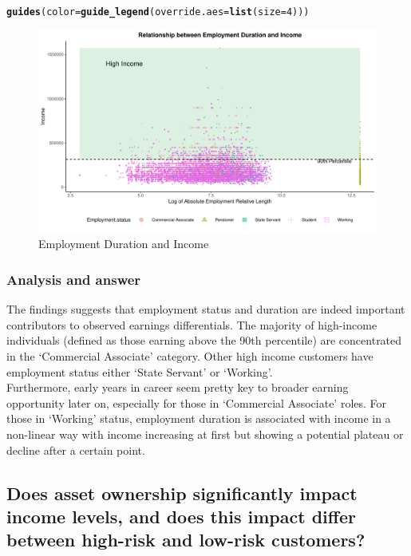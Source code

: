\documentclass{article}\usepackage[]{graphicx}\usepackage[]{xcolor}
\makeatletter
\def\maxwidth{ %
  \ifdim\Gin@nat@width>\linewidth
    \linewidth
  \else
    \Gin@nat@width
  \fi
}
\newcommand{\hlnum}[1]{\textcolor[rgb]{0.686,0.059,0.569}{#1}}%
\newcommand{\hldef}[1]{\textcolor[rgb]{0.345,0.345,0.345}{#1}}%
\newcommand{\hlkwc}[1]{\textcolor[rgb]{0.333,0.667,0.333}{#1}}%
\newcommand{\hlkwd}[1]{\textcolor[rgb]{0.737,0.353,0.396}{\textbf{#1}}}%
\newenvironment{kframe}{%
 \def\at@end@of@kframe{}%
 \ifinner\ifhmode%
  \def\at@end@of@kframe{\end{minipage}}%
  \begin{minipage}{\columnwidth}%
 \fi\fi%
 \def\FrameCommand##1{\hskip\@totalleftmargin \hskip-\fboxsep
 \colorbox{shadecolor}{##1}\hskip-\fboxsep
     \hskip-\linewidth \hskip-\@totalleftmargin \hskip\columnwidth}%
 \MakeFramed {\advance\hsize-\width
   \@totalleftmargin\z@ \linewidth\hsize
   \@setminipage}}%
 {\par\unskip\endMakeFramed%
 \at@end@of@kframe}
\newenvironment{knitrout}{}{} %
\makeatother
\begin{document}
\begin{knitrout}
\begin{kframe}
\begin{alltt}
  \hlkwd{guides}\hldef{(}\hlkwc{color} \hldef{=} \hlkwd{guide_legend}\hldef{(}\hlkwc{override.aes} \hldef{=} \hlkwd{list}\hldef{(}\hlkwc{size} \hldef{=} \hlnum{4}\hldef{)))}
\end{alltt}
\end{kframe}\begin{figure}[H]
\includegraphics[width=\maxwidth]{figure/unnamed-chunk-46-1} \caption[Employment Duration and Income]{Employment Duration and Income}\label{fig:unnamed-chunk-46}
\end{figure}

\end{knitrout}

\subsubsection{Analysis and answer}

The findings suggests that employment status and duration are indeed important contributors to observed earnings differentials.  The majority of high-income individuals (defined as those earning above the 90th percentile) are concentrated in the `Commercial Associate' category. Other high income customers have employment status either `State Servant' or `Working'. \\

Furthermore, early years in career seem pretty key to broader earning opportunity later on, especially for those in `Commercial Associate' roles.  For those in `Working' status, employment duration is associated with income in a non-linear way with income increasing at first but showing a potential plateau or decline after a certain point. 


\subsection{Does asset ownership significantly impact income levels, and does this impact differ between high-risk and low-risk customers?}
\end{document}
